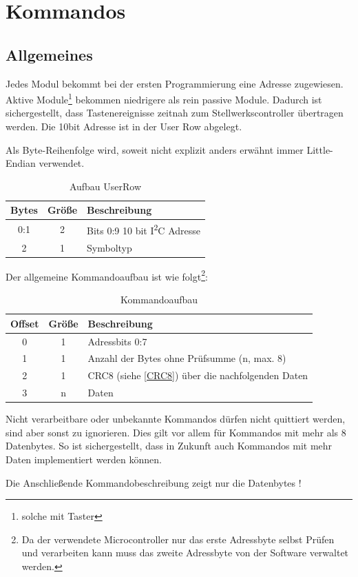 \documentclass[10pt,a4paper]{article}
\begin{document}
\section{Kommandos}
\subsection{Allgemeines}
Jedes Modul bekommt bei der ersten Programmierung eine Adresse zugewiesen. Aktive Module\footnote{solche mit Taster} bekommen niedrigere als rein passive Module. Dadurch ist sichergestellt, dass Tastenereignisse zeitnah zum Stellwerkscontroller übertragen werden. Die 10bit Adresse ist in der User Row abgelegt.

Als Byte-Reihenfolge wird, soweit nicht explizit anders erwähnt immer Little-Endian verwendet.

\begin{table}[H]
\centering
\begin{tabular}{c|c|l}
\textbf{Bytes} & \textbf{Größe} & \textbf{Beschreibung} \\ \hline
0:1 & 2 & Bits 0:9 10 bit I\textsuperscript{2}C Adresse \\
2 & 1 & Symboltyp 
\end{tabular}
\caption{Aufbau UserRow}
\end{table}

Der allgemeine Kommandoaufbau ist wie folgt\footnote{Da der verwendete Microcontroller nur das erste Adressbyte selbst Prüfen und verarbeiten kann muss das zweite Adressbyte von der Software verwaltet werden.}:

\begin{table}[H]
\centering
\begin{tabular}{c|c|l}
\textbf{Offset} & \textbf{Größe} & \textbf{Beschreibung} \\ \hline
0 & 1 & Adressbits 0:7\\
1 & 1 & Anzahl der Bytes  ohne Prüfsumme (n, max. 8)\\
2 & 1 & CRC8 (siehe \ref{CRC8}) über die nachfolgenden Daten\\
3 & n & Daten
\end{tabular}
\caption{Kommandoaufbau}
\end{table}
Nicht verarbeitbare oder unbekannte Kommandos dürfen nicht quittiert werden, sind aber sonst zu ignorieren. Dies gilt vor allem für Kommandos mit mehr als 8 Datenbytes. So ist sichergestellt, dass in Zukunft auch Kommandos mit mehr Daten implementiert werden können.

Die Anschließende Kommandobeschreibung zeigt nur die Datenbytes !
\end{document}

